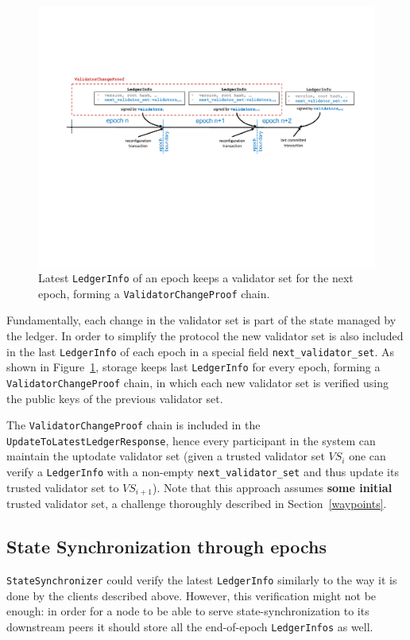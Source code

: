 \documentclass[letterpaper,10pt]{article}
\begin{document}
\begin{figure}[ht]
	\centering
	\includegraphics[width=\textwidth]{figures/ledger-store.pdf}
	\caption{\footnotesize{Latest \texttt{LedgerInfo} of an epoch keeps a validator set for the next epoch, forming a \texttt{ValidatorChangeProof} chain.}}
	\label{fig:ledger-store}
\end{figure}

Fundamentally, each change in the validator set is part of the state managed by the ledger. In order to simplify the protocol the new validator set is also included in the last \texttt{LedgerInfo} of each epoch in a special field \texttt{next\_validator\_set}. As shown in Figure~\ref{fig:ledger-store}, storage keeps last \texttt{LedgerInfo} for every epoch, forming a \texttt{ValidatorChangeProof} chain, in which each new validator set is verified using the public keys of the previous validator set.

The \texttt{ValidatorChangeProof} chain is included in the \texttt{UpdateToLatestLedgerResponse}, hence every participant in the system can maintain the uptodate validator set (given a trusted validator set $VS_i$ one can verify a \texttt{LedgerInfo} with a non-empty \texttt{next\_validator\_set} and thus update its trusted validator set to $VS_{i+1}$). Note that this approach assumes \textbf{some initial} trusted validator set, a challenge thoroughly described in Section~\ref{waypoints}.

\subsection{State Synchronization through epochs}
\label{state-sync-epochs}
\texttt{StateSynchronizer} could verify the latest \texttt{LedgerInfo} similarly to the way it is done by the clients described above. However, this verification might not be enough: in order for a node to be able to serve state-synchronization to its downstream peers it should store all the end-of-epoch \texttt{LedgerInfos} as well.
\end{document}
